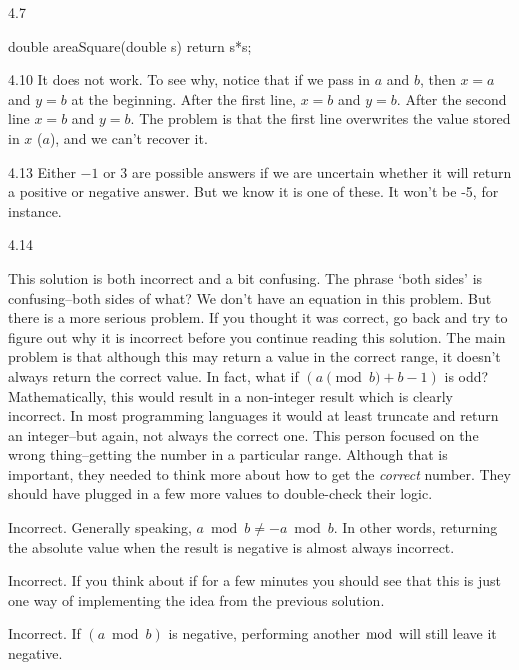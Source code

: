 \begin{Answer}{4.7}
\begin{code}
double areaSquare(double s) { return s*s; }
\end{code}
\end{Answer}
\begin{Answer}{4.10}
It does not work.  To see why,
notice that if we pass in $a$ and $b$, then $x=a$ and $y=b$ at the beginning.
After the first line, $x=b$ and $y=b$.
After the second line $x=b$ and $y=b$.
The problem is that the first line overwrites the value stored in $x$ ($a$), and we can't recover it.
\end{Answer}
\begin{Answer}{4.13}
Either $-1$ or $3$ are possible answers if we are uncertain whether it will return a positive
or negative answer.  But we know it is one of these.  It won't be -5, for instance.
\end{Answer}
\begin{Answer}{4.14}
\begin{solevalenum}
\item
This solution is both incorrect and a bit confusing.
The phrase `both sides' is confusing--both sides of what?
We don't have an equation in this problem.
But there is a more serious problem.
If you thought it was correct, go back and try to figure out why it is incorrect before you
continue reading this solution.
The main problem is that although this may return
a value in the correct range, it doesn't always return the correct value.  In fact, what if
$(a\pmod{b} + b-1)$ is odd?  Mathematically, this would result in a non-integer result which is
clearly incorrect.  In most programming languages it would at least truncate and
return an integer--but again, not always the correct one.
This person focused on the wrong thing--getting the number in a particular range.  Although that
is important, they needed to think more about how to get the {\em correct} number.
They should have plugged in a few more values to double-check their logic.
\item
Incorrect. Generally speaking, $a\bmod b \neq -a\bmod b$.
In other words, returning the absolute value when the result is negative is almost always incorrect.
\item
Incorrect.  If you think about if for a few minutes you should see that this is just
one way of implementing the idea from the previous solution.
\item
Incorrect.  If $(a\bmod b)$ is negative, performing another $\bmod$ will still leave it negative.
\end{solevalenum}
\end{Answer}
